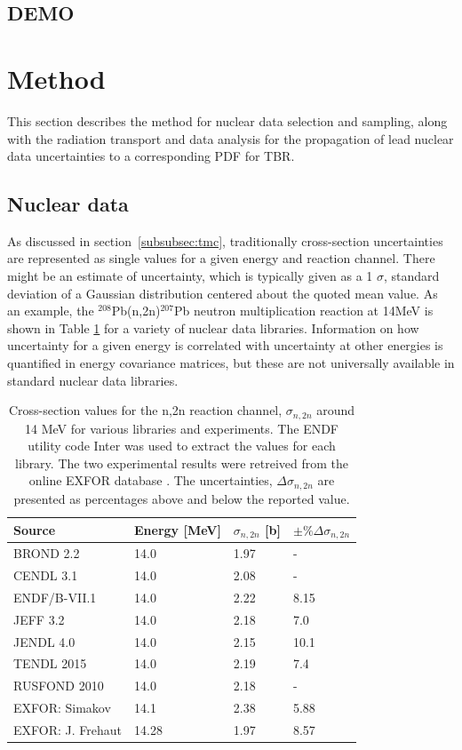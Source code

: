 \FloatBarrier
\subsection{DEMO}

\FloatBarrier
\section{Method}
This section describes the method for nuclear data selection and sampling, along with the radiation transport and data analysis for the propagation of lead nuclear data uncertainties to a corresponding PDF for TBR.

\subsection{Nuclear data}
\label{sec:data}
As discussed in section~\ref{subsubsec:tmc}, traditionally cross-section uncertainties are represented as single values for a given energy and reaction channel. There might be an estimate of uncertainty, which is typically given as a 1 $\sigma$, standard deviation of a Gaussian distribution centered about the quoted mean value. As an example, the $^{208}$Pb(n,2n)$^{207}$Pb neutron multiplication reaction at 14MeV is shown in Table \ref{tab:lead_by_lib} for a variety of nuclear data libraries. Information on how uncertainty for a given energy is correlated with uncertainty at other energies is quantified in energy covariance matrices, but these are not universally available in standard nuclear data libraries.

\begin{table}[H]
  \footnotesize
  \centering
  \begin{tabularx}{\textwidth}{XXXX}
    \toprule
    Source & Energy [MeV] & $\sigma_{n,2n}$ [b] & $\pm\%\Delta\sigma_{n,2n}$ \\
    \midrule
    BROND 2.2 & 14.0 & 1.97 & - \\
    CENDL 3.1 & 14.0 & 2.08 & - \\
    ENDF/B-VII.1 & 14.0 & 2.22 & 8.15 \\
    JEFF 3.2 & 14.0 & 2.18 & 7.0 \\
    JENDL 4.0 & 14.0 & 2.15 & 10.1 \\
    TENDL 2015 & 14.0 & 2.19 & 7.4 \\
    RUSFOND 2010 & 14.0 & 2.18 & - \\
    EXFOR: Simakov & 14.1 & 2.38 & 5.88 \\
    EXFOR: J. Frehaut & 14.28 & 1.97 & 8.57 \\
    \bottomrule
  \end{tabularx}
  \caption{Cross-section values for the n,2n reaction channel, $\sigma_{n,2n}$ around 14 MeV for various libraries and experiments. The ENDF utility code Inter \cite{Dunford2002} was used to extract the values for each library. The two experimental results were retreived from the online EXFOR database \cite{exfor2017}. The uncertainties, $\Delta\sigma_{n,2n}$ are presented as percentages above and below the reported value.}
  \label{tab:lead_by_lib}
\end{table}

